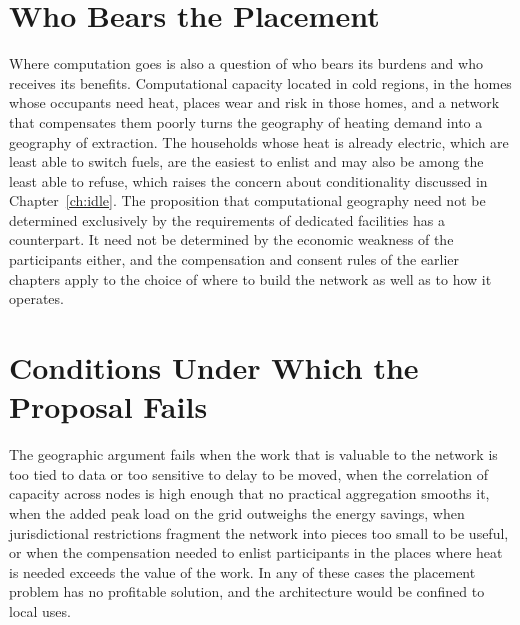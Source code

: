 \section{Who Bears the Placement}

Where computation goes is also a question of who bears its burdens and who receives its benefits. Computational capacity located in cold regions, in the homes whose occupants need heat, places wear and risk in those homes, and a network that compensates them poorly turns the geography of heating demand into a geography of extraction. The households whose heat is already electric, which are least able to switch fuels, are the easiest to enlist and may also be among the least able to refuse, which raises the concern about conditionality discussed in Chapter~\ref{ch:idle}. The proposition that computational geography need not be determined exclusively by the requirements of dedicated facilities has a counterpart. It need not be determined by the economic weakness of the participants either, and the compensation and consent rules of the earlier chapters apply to the choice of where to build the network as well as to how it operates.

\section{Conditions Under Which the Proposal Fails}

The geographic argument fails when the work that is valuable to the network is too tied to data or too sensitive to delay to be moved, when the correlation of capacity across nodes is high enough that no practical aggregation smooths it, when the added peak load on the grid outweighs the energy savings, when jurisdictional restrictions fragment the network into pieces too small to be useful, or when the compensation needed to enlist participants in the places where heat is needed exceeds the value of the work. In any of these cases the placement problem has no profitable solution, and the architecture would be confined to local uses.
